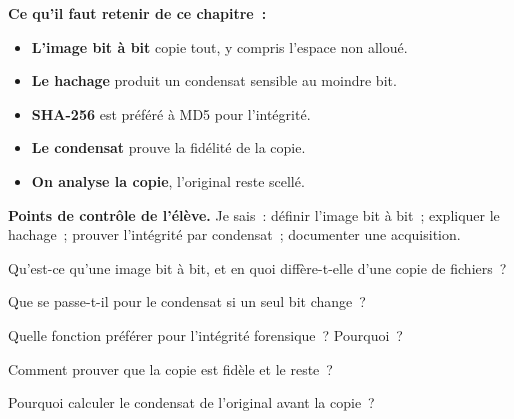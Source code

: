 \separateur

\begin{boxresume}
\textbf{Ce qu'il faut retenir de ce chapitre~:}
\begin{itemize}
    \item \textbf{L'image bit à bit} copie tout, y compris l'espace non
          alloué.
    \item \textbf{Le hachage} produit un condensat sensible au moindre bit.
    \item \textbf{SHA-256} est préféré à MD5 pour l'intégrité.
    \item \textbf{Le condensat} prouve la fidélité de la copie.
    \item \textbf{On analyse la copie}, l'original reste scellé.
\end{itemize}
\end{boxresume}

\begin{boxinfo}
\textbf{Points de contrôle de l'élève.} Je sais~: définir l'image bit à bit~;
expliquer le hachage~; prouver l'intégrité par condensat~; documenter une
acquisition.
\end{boxinfo}

\bigskip

\begin{boxexo}[title={\ding{45}\quad Exercice~8.1. Image \niveaubase}]
Qu'est-ce qu'une image bit à bit, et en quoi diffère-t-elle d'une copie de
fichiers~?
\end{boxexo}

\begin{boxexo}[title={\ding{45}\quad Exercice~8.2. Condensat \niveaubase}]
Que se passe-t-il pour le condensat si un seul bit change~?
\end{boxexo}

\begin{boxexo}[title={\ding{45}\quad Exercice~8.3. MD5 ou SHA-256 \niveaubase}]
Quelle fonction préférer pour l'intégrité forensique~? Pourquoi~?
\end{boxexo}

\begin{boxexo}[title={\ding{45}\quad Exercice~8.4. Prouver \niveaumoyen}]
Comment prouver que la copie est fidèle et le reste~?
\end{boxexo}

\begin{boxexo}[title={\ding{45}\quad Exercice~8.5. Avant la copie \niveaumoyen}]
Pourquoi calculer le condensat de l'original avant la copie~?
\end{boxexo}

